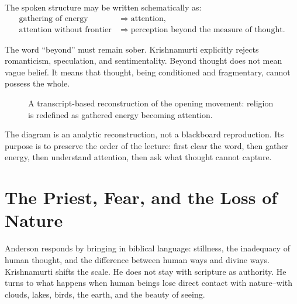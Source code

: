 The spoken structure may be written schematically as:
\begin{align}
\text{gathering of energy}
&\Rightarrow \text{attention},\\
\text{attention without frontier}
&\Rightarrow \text{perception beyond the measure of thought}.
\end{align}

The word ``beyond'' must remain sober. Krishnamurti explicitly rejects romanticism, speculation, and sentimentality. Beyond thought does not mean vague belief. It means that thought, being conditioned and fragmentary, cannot possess the whole.

\begin{figure}
\centering
{}
\caption{A transcript-based reconstruction of the opening movement: religion is redefined as gathered energy becoming attention.}
\end{figure}

The diagram is an analytic reconstruction, not a blackboard reproduction. Its purpose is to preserve the order of the lecture: first clear the word, then gather energy, then understand attention, then ask what thought cannot capture.

\section{The Priest, Fear, and the Loss of Nature}

Anderson responds by bringing in biblical language: stillness, the inadequacy of human thought, and the difference between human ways and divine ways. Krishnamurti shifts the scale. He does not stay with scripture as authority. He turns to what happens when human beings lose direct contact with nature--with clouds, lakes, birds, the earth, and the beauty of seeing.

